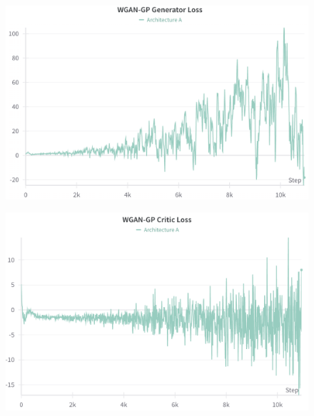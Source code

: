 \documentclass{article}
\begin{document}
\begin{figure}[ht]
\begin{minipage}[b]{0.45\textwidth}
        \includegraphics[width=\textwidth]{../src/gp_zoom_in_gen.png}
        \label{fig:image1}
    \end{minipage}
    \hfill
    \begin{minipage}[b]{0.45\textwidth}
        \centering
        \includegraphics[width=\textwidth]{../src/gp_zoom_in_crit.png}
        \label{fig:image2}
    \end{minipage}
\end{figure}
\end{document}
